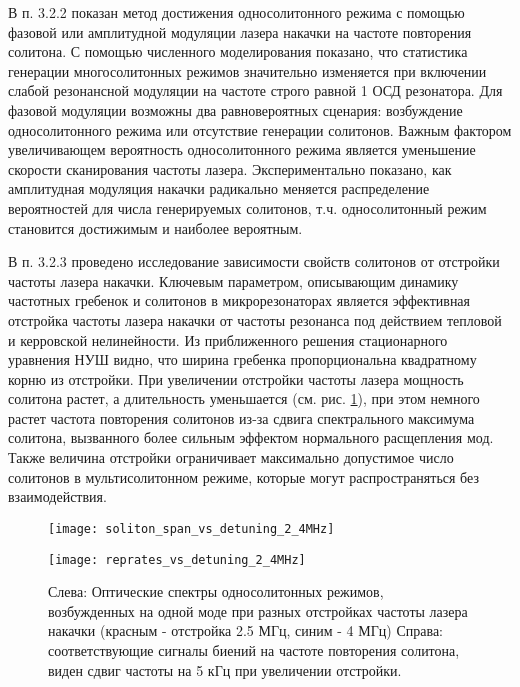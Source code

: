 В п. 3.2.2 показан метод достижения односолитонного режима с помощью фазовой или амплитудной модуляции лазера накачки на частоте повторения солитона. С помощью численного моделирования показано, что статистика генерации многосолитонных режимов значительно изменяется при включении слабой резонансной модуляции на частоте строго равной 1 ОСД резонатора. Для фазовой модуляции возможны два равновероятных сценария: возбуждение односолитонного режима или отсутствие генерации солитонов. Важным фактором увеличивающем вероятность односолитонного режима является уменьшение скорости сканирования частоты лазера. Экспериментально показано, как амплитудная модуляция накачки радикально меняется распределение вероятностей для числа генерируемых солитонов, т.ч. односолитонный режим становится достижимым и наиболее вероятным.

В п. 3.2.3 проведено исследование зависимости свойств солитонов от отстройки частоты лазера накачки. Ключевым параметром, описывающим динамику частотных гребенок и солитонов в микрорезонаторах является эффективная отстройка частоты лазера накачки от частоты резонанса под действием тепловой и керровской нелинейности. Из приближенного решения стационарного уравнения НУШ видно, что ширина гребенка пропорциональна квадратному корню из отстройки. При увеличении отстройки частоты лазера мощность солитона растет, а длительность уменьшается (см. рис. \ref{detuning_dependant}), при этом немного растет частота повторения солитонов из-за сдвига спектрального максимума солитона, вызванного более сильным эффектом нормального расщепления мод. Также величина отстройки ограничивает максимально допустимое число солитонов в мультисолитонном режиме, которые могут распространяться без взаимодействия.

\begin{figure}[ht]
  \begin{minipage}[ht]{0.49\linewidth}\centering
    \texttt{[image: soliton\_span\_vs\_detuning\_2\_4MHz]}
  \end{minipage}
  \hfill
  \begin{minipage}[ht]{0.49\linewidth}\centering
    \texttt{[image: reprates\_vs\_detuning\_2\_4MHz]}
  \end{minipage}
  \caption{Слева: Оптические спектры односолитонных режимов, возбужденных на одной моде при разных отстройках частоты лазера накачки (красным - отстройка 2.5 МГц, синим - 4 МГц) Справа: соответствующие сигналы биений на частоте повторения солитона, виден сдвиг частоты на 5 кГц при увеличении отстройки.}
  \label{detuning_dependant}
\end{figure}

